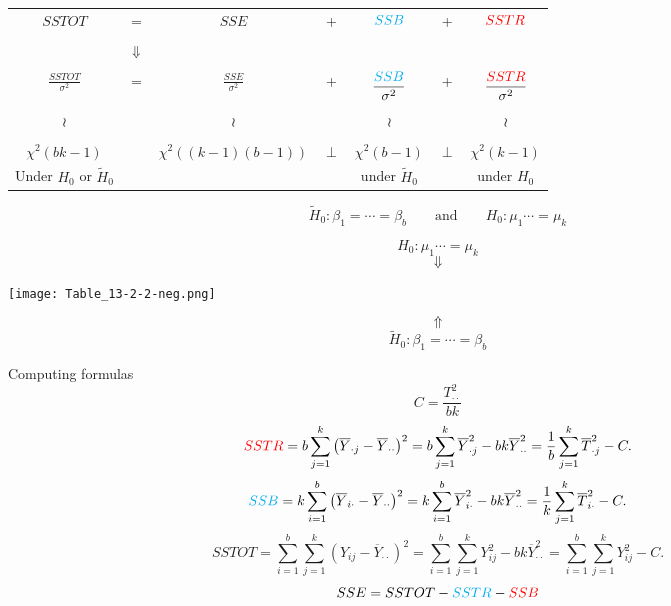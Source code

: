 \begin{frame}[fragile]
	\begin{center}
		\begin{tabular}{ccccccc}
			$\displaystyle SSTOT$ &
			= &
			$\displaystyle SSE$ &
			+ &
			$\displaystyle \textcolor{cyan}{SSB}$ &+& $\displaystyle \textcolor{red}{SSTR}$ \\ \\
					    &$\Downarrow$&&& &&\\ \\
			$\displaystyle \frac{SSTOT}{\sigma^2}$ &
			= &
			$\displaystyle \frac{SSE}{\sigma^2}$ &
			+ &
			$\displaystyle \frac{\textcolor{cyan}{SSB}}{\sigma^2}$ &+& $\displaystyle \frac{\textcolor{red}{SSTR}}{\sigma^2}$ \\ \\
			$\wr$&& $\wr$ &  & $\wr$ && $\wr$ \\ \\
			$\chi^2(bk-1)$ && $\chi^2((k-1)(b-1))$ & $\perp$ & $\chi^2(b-1)$ & $\perp$ & $\chi^2(k-1)$
			\\[2em]
			Under $H_0$ or $\widetilde H_0$& &\checkmark&& under $\widetilde{H}_0$ && under $H_0$
		\end{tabular}
		\vfill
		\[
		\widetilde H_0 : \beta_1=\cdots = \beta_b
		\qquad\text{and}\qquad
		H_0: \mu_1\cdots = \mu_k
		\]
	\end{center}
\end{frame}
\begin{frame}[fragile]


	\phantom{a}\hfill\begin{minipage}{0.6\textwidth}
		\[
		H_0: \mu_1\cdots = \mu_k
		\]
		\[
		\Downarrow
		\]
	\end{minipage}

	\texttt{[image: Table\_13-2-2-neg.png]}

	\phantom{a}\hfill\begin{minipage}{0.6\textwidth}
		\[
		\Uparrow
		\]
	\[
		\widetilde H_0 : \beta_1=\cdots = \beta_b
	\]
	\end{minipage}
\end{frame}
\begin{frame}[fragile]{Computing formulas}
\[
	C =  \frac{T_{\cdot\cdot}^2}{bk}
\]
\vfill
\[
	\textcolor{red}{SSTR} = b\sum_{j=1}^k\left(\overline{Y}_{\cdot j}-\overline{Y}_{\cdot\cdot}\right)^2
	= b\sum_{j=1}^k \overline{Y}_{\cdot j}^2 - bk \overline{Y}_{\cdot\cdot}^2 =
	\frac{1}{b}\sum_{j=1}^k \overline{T}_{\cdot j}^2 -C.
\]
\vfill
\[
	\textcolor{cyan}{SSB} = k\sum_{i=1}^b\left(\overline{Y}_{i\cdot}-\overline{Y}_{\cdot\cdot}\right)^2
	= k\sum_{i=1}^b \overline{Y}_{i\cdot}^2 - bk \overline{Y}_{\cdot\cdot}^2 =
	\frac{1}{k}\sum_{j=1}^k \overline{T}_{i\cdot}^2 -C.
\]
\vfill
\[
	SSTOT =
	\sum_{i=1}^b\sum_{j=1}^k \left(Y_{ij}-\overline{Y}_{\cdot\cdot}\right)^2
	=\sum_{i=1}^b\sum_{j=1}^k Y_{ij}^2-bk\overline{Y}_{\cdot\cdot}^2
	=\sum_{i=1}^b\sum_{j=1}^k Y_{ij}^2-C.
\]
\vfill
\[
SSE = SSTOT-\textcolor{cyan}{SSTR}-\textcolor{red}{SSB}
\]
\end{frame}
